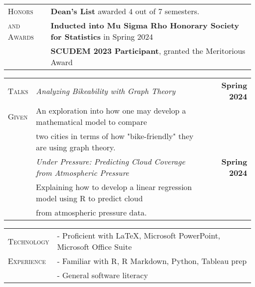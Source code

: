 \documentclass{article}
\begin{document}
\vspace{2.5mm}

\begin{tabular}{l l}
\textsc{Honors} & \textbf{Dean's List} awarded $4$ out of $7$ semesters.\\

\textsc{and Awards}	& \textbf{Inducted into Mu Sigma Rho Honorary Society for Statistics} in Spring 2024 \\
					
					& \textbf{SCUDEM 2023 Participant}, granted the Meritorious Award \\
\end{tabular}

\begin{tabular}{l l r}
\textsc{Talks} & \hspace{5mm}\textit{Analyzing Bikeability with Graph Theory} & \textbf{Spring 2024}\\
\textsc{Given} & \hspace{10mm} An exploration into how one may develop a mathematical model to compare & \\
			  & \hspace{7.5mm} two cities in terms of how "bike-friendly" they are using graph theory. & \\
			  
			  & \hspace{5mm}\textit{Under Pressure: Predicting Cloud Coverage from Atmospheric Pressure} & \textbf{Spring 2024}\\
			  &\hspace{10mm} Explaining how to develop a linear regression model using R to predict cloud & \\
			  & \hspace{7.5mm}from atmospheric pressure data.
\end{tabular}

\hspace{2.5mm}

\begin{tabular}{l l}
\textsc{Technology} & - Proficient with \LaTeX , Microsoft PowerPoint, Microsoft Office Suite\\
\textsc{Experience} & - Familiar with R, R Markdown, Python, Tableau prep\\
				    & - General software literacy
\end{tabular}
\end{document}
